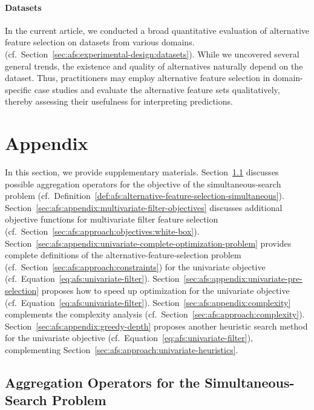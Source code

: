 \documentclass{article}
\theoremstyle{definition}
\begin{document}
\paragraph{Datasets}

In the current article, we conducted a broad quantitative evaluation of alternative feature selection on datasets from various domains. (cf.~Section~\ref{sec:afs:experimental-design:datasets}).
While we uncovered several general trends, the existence and quality of alternatives naturally depend on the dataset.
Thus, practitioners may employ alternative feature selection in domain-specific case studies and evaluate the alternative feature sets qualitatively, thereby assessing their usefulness for interpreting predictions.

\appendix

\section{Appendix}
\label{sec:afs:appendix}

In this section, we provide supplementary materials.
Section~\ref{sec:afs:appendix:simultaneous-objective-aggregation} discusses possible aggregation operators for the objective of the simultaneous-search problem (cf.~Definition~\ref{def:afs:alternative-feature-selection-simultaneous}).
Section~\ref{sec:afs:appendix:multivariate-filter-objectives} discusses additional objective functions for multivariate filter feature selection (cf.~Section~\ref{sec:afs:approach:objectives:white-box}).
Section~\ref{sec:afs:appendix:univariate-complete-optimization-problem} provides complete definitions of the alternative-feature-selection problem (cf.~Section~\ref{sec:afs:approach:constraints}) for the univariate objective (cf.~Equation~\ref{eq:afs:univariate-filter}).
Section~\ref{sec:afs:appendix:univariate-pre-selection} proposes how to speed up optimization for the univariate objective (cf.~Equation~\ref{eq:afs:univariate-filter}).
Section~\ref{sec:afs:appendix:complexity} complements the complexity analysis (cf.~Section~\ref{sec:afs:approach:complexity}).
Section~\ref{sec:afs:appendix:greedy-depth} proposes another heuristic search method for the univariate objective (cf.~Equation~\ref{eq:afs:univariate-filter}), complementing Section~\ref{sec:afs:approach:univariate-heuristics}.

\subsection{Aggregation Operators for the Simultaneous-Search Problem}
\label{sec:afs:appendix:simultaneous-objective-aggregation}
\end{document}
